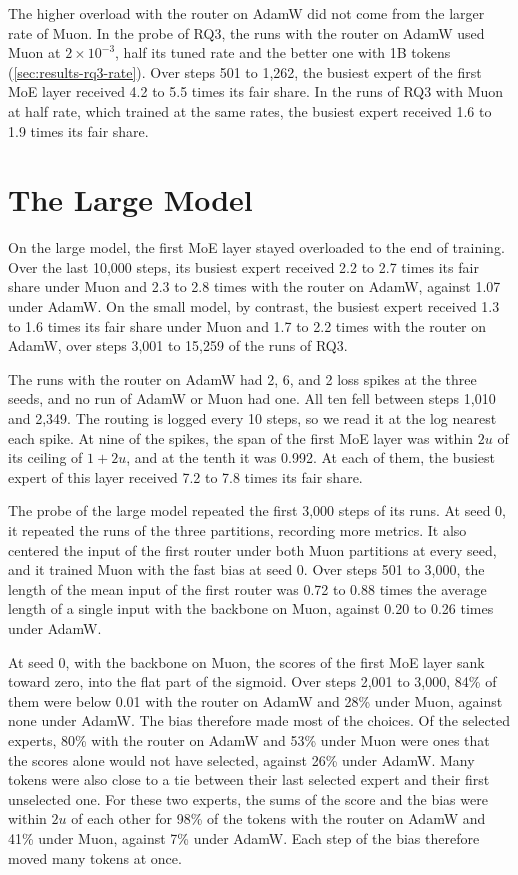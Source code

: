 The higher overload with the router on AdamW did not come from the larger rate of Muon. In the probe of RQ3, the runs with the router on AdamW used Muon at $2 \times 10^{-3}$, half its tuned rate and the better one with 1B tokens (\cref{sec:results-rq3-rate}). Over steps 501 to 1,262, the busiest expert of the first MoE layer received 4.2 to 5.5 times its fair share. In the runs of RQ3 with Muon at half rate, which trained at the same rates, the busiest expert received 1.6 to 1.9 times its fair share.

\section{The Large Model}
\label{app:results-large}
On the large model, the first MoE layer stayed overloaded to the end of training. Over the last 10,000 steps, its busiest expert received 2.2 to 2.7 times its fair share under Muon and 2.3 to 2.8 times with the router on AdamW, against 1.07 under AdamW\@. On the small model, by contrast, the busiest expert received 1.3 to 1.6 times its fair share under Muon and 1.7 to 2.2 times with the router on AdamW, over steps 3,001 to 15,259 of the runs of RQ3.

The runs with the router on AdamW had 2, 6, and 2 loss spikes at the three seeds, and no run of AdamW or Muon had one. All ten fell between steps 1,010 and 2,349. The routing is logged every 10 steps, so we read it at the log nearest each spike. At nine of the spikes, the span of the first MoE layer was within $2u$ of its ceiling of $1 + 2u$, and at the tenth it was 0.992. At each of them, the busiest expert of this layer received 7.2 to 7.8 times its fair share.

The probe of the large model repeated the first 3,000 steps of its runs. At seed 0, it repeated the runs of the three partitions, recording more metrics. It also centered the input of the first router under both Muon partitions at every seed, and it trained Muon with the fast bias at seed 0. Over steps 501 to 3,000, the length of the mean input of the first router was 0.72 to 0.88 times the average length of a single input with the backbone on Muon, against 0.20 to 0.26 times under AdamW.

At seed 0, with the backbone on Muon, the scores of the first MoE layer sank toward zero, into the flat part of the sigmoid. Over steps 2,001 to 3,000, 84\% of them were below 0.01 with the router on AdamW and 28\% under Muon, against none under AdamW\@. The bias therefore made most of the choices. Of the selected experts, 80\% with the router on AdamW and 53\% under Muon were ones that the scores alone would not have selected, against 26\% under AdamW\@. Many tokens were also close to a tie between their last selected expert and their first unselected one. For these two experts, the sums of the score and the bias were within $2u$ of each other for 98\% of the tokens with the router on AdamW and 41\% under Muon, against 7\% under AdamW\@. Each step of the bias therefore moved many tokens at once.


